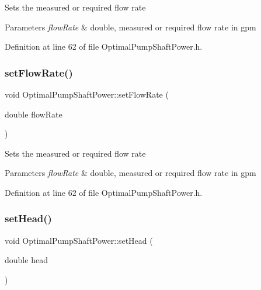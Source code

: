 Sets the measured or required flow rate 
\begin{DoxyParams}{Parameters}
{\em flow\+Rate} & double, measured or required flow rate in gpm \\
\hline
\end{DoxyParams}


Definition at line 62 of file Optimal\+Pump\+Shaft\+Power.\+h.

\mbox{\label{class_optimal_pump_shaft_power_a38efdee39db4c3856915f1ab26d44ed2}} 
\subsubsection{\texorpdfstring{set\+Flow\+Rate()}{setFlowRate()}\hspace{0.1cm}{\footnotesize\ttfamily [3/3]}}
{\footnotesize\ttfamily void Optimal\+Pump\+Shaft\+Power\+::set\+Flow\+Rate (\begin{DoxyParamCaption}\item[{double}]{flow\+Rate }\end{DoxyParamCaption})\hspace{0.3cm}{\ttfamily [inline]}}

Sets the measured or required flow rate 
\begin{DoxyParams}{Parameters}
{\em flow\+Rate} & double, measured or required flow rate in gpm \\
\hline
\end{DoxyParams}


Definition at line 62 of file Optimal\+Pump\+Shaft\+Power.\+h.

\mbox{\label{class_optimal_pump_shaft_power_aa080c62ff92fc70a4e27e7710e490b62}} 
\subsubsection{\texorpdfstring{set\+Head()}{setHead()}\hspace{0.1cm}{\footnotesize\ttfamily [1/3]}}
{\footnotesize\ttfamily void Optimal\+Pump\+Shaft\+Power\+::set\+Head (\begin{DoxyParamCaption}\item[{double}]{head }\end{DoxyParamCaption})\hspace{0.3cm}{\ttfamily [inline]}}


